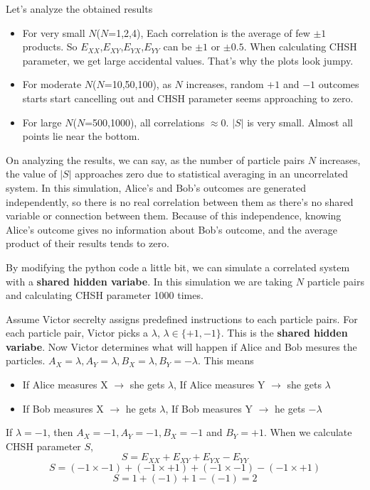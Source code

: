 \documentclass[14pt,a4paper]{extarticle}
\begin{document}
Let's analyze the obtained results
\begin{itemize}
    \item For very small $N$($N$=1,2,4), Each correlation is the average of few $\pm1$ products. So $E_{XX}$,$E_{XY}$,$E_{YX}$,$E_{YY}$ can be $\pm1$ or $\pm0.5$. When calculating CHSH parameter, we get large accidental values. That's why the plots look jumpy.
    \item For moderate $N$($N$=10,50,100), as $N$ increases, random $+1$ and $-1$ outcomes starts start cancelling out and CHSH parameter seems approaching to zero.
    \item For large $N$($N$=500,1000), all correlations $\approx 0$. $|S|$ is very small. Almost all points lie near the bottom.
\end{itemize}
On analyzing the results, we can say, as the number of particle pairs $N$ increases, the value of $|S|$ approaches zero due to statistical averaging in an uncorrelated system. In this simulation, Alice’s and Bob’s outcomes are generated independently, so there is no real correlation between them as there's no shared variable or connection between them. Because of this independence, knowing Alice’s outcome gives no information about Bob’s outcome, and the average product of their results tends to zero.

By modifying the python code a little bit, we can simulate a correlated system with a \textbf{shared hidden variabe}. In this simulation we are taking $N$ particle pairs and calculating CHSH parameter 1000 times.

Assume Victor secrelty assigns predefined instructions to each particle pairs. For each particle pair, Victor picks a $\lambda$, $\lambda \in \{+1, -1\}$. This is the \textbf{shared hidden variabe}. Now Victor determines what will happen if Alice and Bob mesures the particles. $A_X=\lambda, A_Y=\lambda, B_X=\lambda, B_Y=-\lambda$. This means

\begin{itemize}
\item If Alice measures X $\rightarrow$ she gets $\lambda$, If Alice measures Y $\rightarrow$ she gets $\lambda$
\item If Bob measures X $\rightarrow$ he gets $\lambda$, If Bob measures Y $\rightarrow$ he gets $-\lambda$
\end{itemize}

If $\lambda = -1$, then $A_X=-1, A_Y=-1, B_X=-1$ and $B_Y=+1$.
When we calculate CHSH parameter $S$,
\setcounter{equation}{0}
\begin{equation}
S=E_{XX}+E_{XY}+E_{YX}-E_{YY}
\end{equation}
\begin{equation}
S=(-1 \times -1)+(-1 \times +1)+(-1 \times -1)-(-1 \times +1)
\end{equation}
\begin{equation}
S=1+(-1)+1-(-1)=2
\end{equation}
\end{document}
